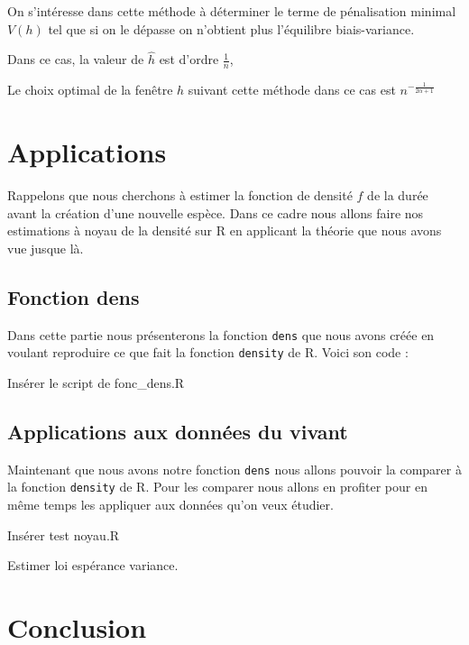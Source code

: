 \documentclass[
]{book}
\begin{document}
On s'intéresse dans cette méthode à déterminer le terme de pénalisation minimal \(V(h)\) tel que si on le dépasse on n'obtient plus l'équilibre biais-variance.\newline

Dans ce cas, la valeur de \(\hat h\) est d'ordre \(\frac{1}{n}\),

Le choix optimal de la fenêtre \(h\) suivant cette méthode dans ce cas est \(n^{-\frac{1}{2 \alpha +1}}\)

\hypertarget{applications}{%
\chapter{Applications}\label{applications}}

Rappelons que nous cherchons à estimer la fonction de densité \(f\) de la durée avant la création d'une nouvelle espèce. Dans ce cadre nous allons faire nos estimations à noyau de la densité sur R en applicant la théorie que nous avons vue jusque là.

\hypertarget{fonction-dens}{%
\section{Fonction dens}\label{fonction-dens}}

Dans cette partie nous présenterons la fonction \texttt{dens} que nous avons créée en voulant reproduire ce que fait la fonction \texttt{density} de R.
Voici son code :

Insérer le script de fonc\_dens.R

\hypertarget{applications-aux-donnuxe9es-du-vivant}{%
\section{Applications aux données du vivant}\label{applications-aux-donnuxe9es-du-vivant}}

Maintenant que nous avons notre fonction \texttt{dens} nous allons pouvoir la comparer à la fonction \texttt{density} de R. Pour les comparer nous allons en profiter pour en même temps les appliquer aux données qu'on veux étudier.

Insérer test noyau.R

Estimer loi espérance variance.

\hypertarget{conclusion}{%
\chapter{Conclusion}\label{conclusion}}

  
\end{document}
